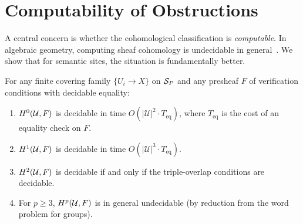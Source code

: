 \documentclass[11pt]{article}
\begin{document}
\section{Computability of Obstructions}\label{sec:computability}

A central concern is whether the cohomological classification is
\emph{computable}.  In algebraic geometry, computing sheaf cohomology
is undecidable in general~\cite{serre1955}.  We show that for semantic
sites, the situation is fundamentally better.

\begin{theorem}
\label{thm:decidability}
For any finite covering family $\{U_i \to X\}$ on $\mathcal{S}_P$ and any
presheaf $F$ of verification conditions with decidable equality:
\begin{enumerate}[label=(\roman*),nosep]
  \item $H^{0}(\mathcal{U}, F)$ is decidable in time
        $O(|\mathcal{U}|^2 \cdot T_{\mathrm{eq}})$, where
        $T_{\mathrm{eq}}$ is the cost of an equality check on $F$.
  \item $H^{1}(\mathcal{U}, F)$ is decidable in time
        $O(|\mathcal{U}|^3 \cdot T_{\mathrm{eq}})$.
  \item $H^{2}(\mathcal{U}, F)$ is decidable if and only if the
        triple-overlap conditions are decidable.
  \item For $p \geq 3$, $H^{p}(\mathcal{U}, F)$ is in general
        undecidable (by reduction from the word problem for groups).
\end{enumerate}
\end{theorem}
\end{document}
